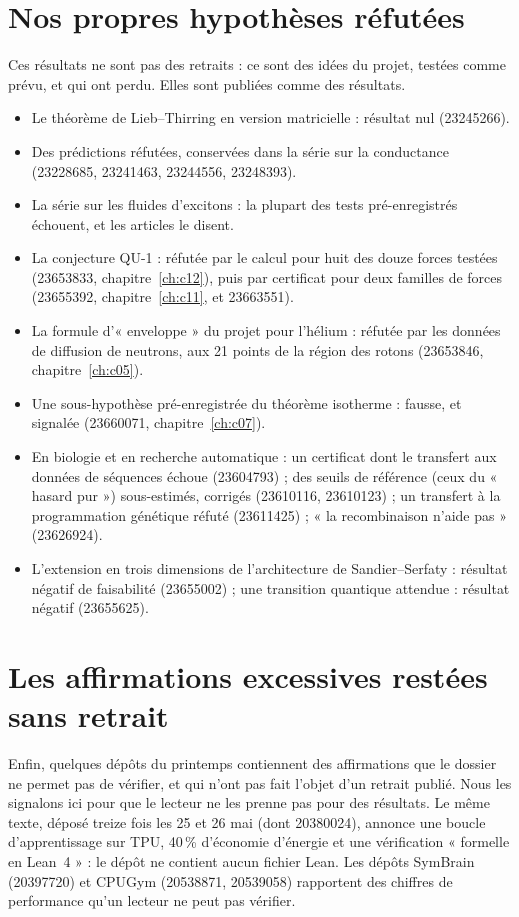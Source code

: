 \section{Nos propres hypothèses réfutées}

Ces résultats ne sont pas des retraits : ce sont des idées du projet, testées comme prévu, et qui ont perdu. Elles sont
publiées comme des résultats.
\begin{itemize}
\item Le théorème de Lieb--Thirring en version matricielle : résultat nul (23245266).
\item Des prédictions réfutées, conservées dans la série sur la conductance (23228685, 23241463, 23244556, 23248393).
\item La série sur les fluides d'excitons : la plupart des tests pré-enregistrés échouent, et les articles le disent.
\item La conjecture QU-1 : réfutée par le calcul pour huit des douze forces testées (23653833,
chapitre~\ref{ch:c12}), puis par certificat pour deux familles de forces
(23655392, chapitre~\ref{ch:c11}, et 23663551).
\item La formule d'« enveloppe » du projet pour l'hélium : réfutée par les données de diffusion de neutrons, aux
21 points de la région des rotons (23653846, chapitre~\ref{ch:c05}).
\item Une sous-hypothèse pré-enregistrée du théorème isotherme : fausse, et signalée (23660071, chapitre~\ref{ch:c07}).
\item En biologie et en recherche automatique : un certificat dont le transfert aux données de séquences échoue
(23604793) ; des seuils de référence (ceux du « hasard pur ») sous-estimés, corrigés (23610116, 23610123) ; un transfert à la programmation
génétique réfuté (23611425) ; « la recombinaison n'aide pas » (23626924).
\item L'extension en trois dimensions de l'architecture de Sandier--Serfaty : résultat négatif de faisabilité
(23655002) ; une transition quantique attendue : résultat négatif (23655625).
\end{itemize}

\section{Les affirmations excessives restées sans retrait}

Enfin, quelques dépôts du printemps contiennent des affirmations que le dossier ne permet pas de vérifier, et qui n'ont
pas fait l'objet d'un retrait publié. Nous les signalons ici pour que le lecteur ne les prenne pas pour des résultats.
Le même texte, déposé treize fois les 25 et 26 mai (dont 20380024), annonce une boucle d'apprentissage sur TPU, 40\,\%
d'économie d'énergie et une vérification « formelle en Lean~4 » : le dépôt ne contient aucun fichier Lean. Les dépôts
SymBrain (20397720) et CPUGym (20538871, 20539058) rapportent des chiffres de performance qu'un lecteur ne peut pas
vérifier.

